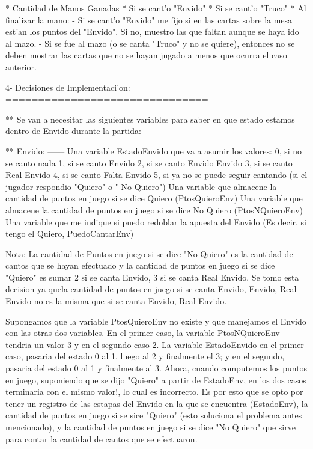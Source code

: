   * Cantidad de Manos Ganadas
  * Si se cant'o "Envido"
  * Si se cant'o "Truco"
  * Al finalizar la mano:
    - Si se cant'o "Envido" me fijo si en las cartas sobre la mesa est'an los puntos del "Envido". Si no, muestro las que faltan aunque se haya ido al mazo.
    - Si se fue al mazo (o se canta "Truco" y no se quiere), entonces no se deben mostrar las cartas que no se hayan jugado a menos que ocurra el caso anterior.


4- Decisiones de Implementaci'on:
===============================

** Se van a necesitar las siguientes variables para saber en que estado estamos dentro de Envido durante la
partida:

** Envido:
   ------
  Una variable EstadoEnvido que va a asumir los valores:
    0, si no se canto nada
    1, si se canto Envido
    2, si se canto Envido Envido
    3, si se canto Real Envido
    4, si se canto Falta Envido
    5, si ya no se puede seguir cantando (si el jugador respondio "Quiero" o " No Quiero")
  Una variable que almacene la cantidad de puntos en juego si se dice Quiero (PtosQuieroEnv)
  Una variable que almacene la cantidad de puntos en juego si se dice No Quiero (PtosNQuieroEnv)
  Una variable que me indique si puedo redoblar la apuesta del Envido (Es decir, si tengo el Quiero, PuedoCantarEnv)

Nota:
  La cantidad de Puntos en juego si se dice "No Quiero" es la cantidad de cantos que se hayan efectuado y la cantidad
de puntos en juego si se dice "Quiero" es sumar 2 si se canta Envido, 3 si se canta Real Envido. Se tomo esta decision ya quela cantidad de puntos en juego si se canta Envido, Envido, Real Envido no es la misma que si se canta Envido, Real Envido.

  Supongamos que la variable PtosQuieroEnv no existe y que manejamos el Envido con las otras dos variables. En el primer caso, la variable PtosNQuieroEnv tendria un valor 3 y en el segundo caso 2. La variable EstadoEnvido en el primer caso, pasaria del estado 0 al 1, luego al 2 y finalmente el 3; y en el segundo, pasaria del estado 0 al 1 y finalmente al 3. Ahora, cuando computemos los puntos en juego, suponiendo que se dijo "Quiero" a partir de EstadoEnv, en los dos casos terminaria con el mismo valor!, lo cual es incorrecto. Es por esto que se opto por tener un registro de las estapas del Envido en la que se encuentra (EstadoEnv), la cantidad de puntos en juego si se sice "Quiero" (esto soluciona el problema antes mencionado), y la cantidad de puntos en juego si se dice "No Quiero" que sirve para contar la cantidad de cantos que se efectuaron.

